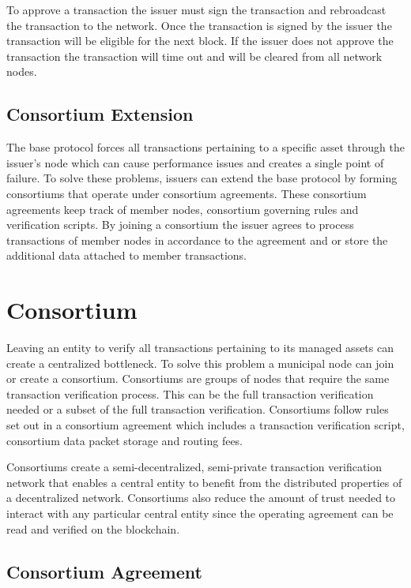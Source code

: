 \documentclass[12pt]{article}
\begin{document}
To approve a transaction the issuer must sign the transaction and rebroadcast 
the transaction to the network. Once the transaction is signed by the issuer
the transaction will be eligible for the next block.  
If the issuer does not approve the transaction the transaction will
time out and will be cleared from all network nodes.

\subsection{Consortium Extension}

The base protocol forces all transactions pertaining to a specific asset through 
the issuer's node which can cause performance issues and creates a single point 
of failure.  To solve these problems, issuers can extend the base protocol by 
forming consortiums that operate under consortium agreements.  These consortium 
agreements keep track of member nodes, consortium governing rules and 
verification scripts.  By joining a consortium the issuer agrees to process 
transactions of member nodes in accordance to the agreement and or store 
the additional data attached to member transactions.

\section{Consortium}

Leaving an entity to verify all transactions pertaining to its managed assets can create 
a centralized bottleneck.  To solve this problem a municipal node can join or create a consortium.  
Consortiums are groups of nodes that require the same transaction verification process.  
This can be the full transaction verification needed or a subset of the full transaction verification. 
Consortiums follow rules set out in a consortium agreement which includes a transaction 
verification script, consortium data packet storage and routing fees.

Consortiums create a semi-decentralized, semi-private transaction verification network that 
enables a central entity to benefit from the distributed properties of a decentralized network.  
Consortiums also reduce the amount of trust needed to interact with any particular central 
entity since the operating agreement can be read and verified on the blockchain.


\subsection{Consortium Agreement}
\end{document}
